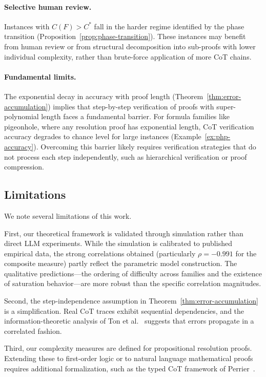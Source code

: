 \paragraph{Selective human review.}
Instances with $C(F) > C^*$ fall in the harder regime identified by the phase
transition (Proposition~\ref{prop:phase-transition}).  These instances may
benefit from human review or from structural decomposition into sub-proofs with
lower individual complexity, rather than brute-force application of more CoT
chains.

\paragraph{Fundamental limits.}
The exponential decay in accuracy with proof length
(Theorem~\ref{thm:error-accumulation}) implies that step-by-step verification
of proofs with super-polynomial length faces a fundamental barrier.  For
formula families like pigeonhole, where any resolution proof has exponential
length, CoT verification accuracy degrades to chance level for large instances
(Example~\ref{ex:php-accuracy}).  Overcoming this barrier likely requires
verification strategies that do not process each step independently, such as
hierarchical verification or proof compression.

\subsection{Limitations}\label{sec:limitations}

We note several limitations of this work.

First, our theoretical framework is validated through simulation rather than
direct LLM experiments.  While the simulation is calibrated to published
empirical data, the strong correlations obtained (particularly $\rho = -0.991$
for the composite measure) partly reflect the parametric model construction.
The qualitative predictions---the ordering of difficulty across families and
the existence of saturation behavior---are more robust than the specific
correlation magnitudes.

Second, the step-independence assumption in
Theorem~\ref{thm:error-accumulation} is a simplification.  Real CoT traces
exhibit sequential dependencies, and the information-theoretic analysis of Ton
et al.~\cite{ton2025understanding} suggests that errors propagate in a
correlated fashion.

Third, our complexity measures are defined for propositional resolution proofs.
Extending these to first-order logic or to natural language mathematical proofs
requires additional formalization, such as the typed CoT framework of
Perrier~\cite{perrier2025typed}.

